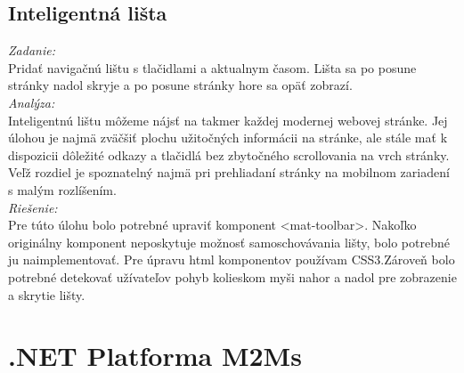 \documentclass[11pt, oneside]{report}
\begin{document}
\subsection*{Inteligentná lišta }
\textit{Zadanie:}\\
Pridať navigačnú lištu s tlačidlami a aktualnym časom. Lišta sa po posune stránky nadol skryje a po posune stránky hore sa opäť zobrazí.
\\\textit{Analýza:}\\
Inteligentnú lištu môžeme nájsť na takmer každej modernej webovej stránke. Jej úlohou je najmä zväčšiť plochu užitočných informácii na stránke, ale stále mať k dispozicii dôležité odkazy a tlačidlá  bez  zbytočného scrollovania na vrch stránky. Veľž rozdiel je spoznatelný najmä pri prehliadaní stránky na mobilnom zariadení s malým rozlíšením. 
\\\textit{Riešenie:}\\
Pre túto úlohu bolo potrebné upraviť komponent \textsf{<mat-toolbar>}. Nakoľko originálny komponent neposkytuje možnosť samoschovávania lišty, bolo potrebné ju naimplementovať. Pre úpravu html komponentov používam CSS3.Zároveň bolo potrebné detekovať užívateľov pohyb kolieskom myši nahor a nadol pre zobrazenie a skrytie lišty.

\section{.NET Platforma M2Ms}

\newpage	


\thispagestyle{empty}
\nocite{*}
\clearpage

\printbibliography
\end{document}
